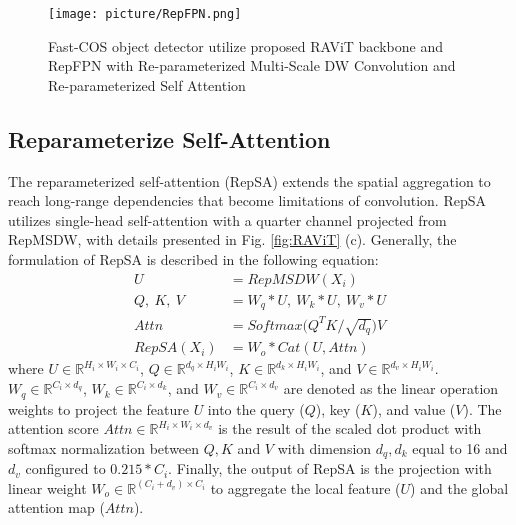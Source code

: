 \begin{figure*}
    \centering
    \texttt{[image: picture/RepFPN.png]}
    \caption{Fast-COS object detector utilize proposed RAViT backbone and RepFPN with Re-parameterized Multi-Scale DW Convolution and Re-parameterized Self Attention}
    \label{fig:RepFPN}
\end{figure*} 

\subsection{Reparameterize Self-Attention}
The reparameterized self-attention (RepSA) extends the spatial aggregation to reach long-range dependencies that become limitations of convolution. RepSA utilizes single-head self-attention with a quarter channel projected from RepMSDW, with details presented in Fig. \ref{fig:RAViT} (c). Generally, the formulation of RepSA is described in the following equation:
\begin{align}
    U &= RepMSDW(X_i) \\
    Q,\ K,\ V &=W_q*U,\ W_k*U,\ W_v*U\\
    Attn &= Softmax\Big(Q^TK/\sqrt{d_{q}}\Big)V \\
    RepSA(X_i) &=W_o*Cat(U,Attn)
\end{align}
where $U\in\mathbb{R}^{H_i\times W_i\times C_i}$, $Q\in\mathbb{R}^{d_q\times H_iW_i}$, $K\in\mathbb{R}^{d_k\times H_iW_i}$, and $V\in\mathbb{R}^{d_v\times H_iW_i}$. $W_q\in\mathbb{R}^{C_i\times d_q}$, $W_k\in\mathbb{R}^{C_i\times d_k}$, and $W_v\in\mathbb{R}^{C_i\times d_v}$ are denoted as the linear operation weights to project the feature $U$ into the query ($Q$), key ($K$), and value ($V$). The attention score $Attn\in\mathbb{R}^{H_i\times W_i\times d_v}$ is the result of the scaled dot product with softmax normalization between $Q, K$ and $V$ with dimension $d_q, d_k$ equal to 16 and $d_v$ configured to $0.215 * C_i$. Finally, the output of RepSA is the projection with linear weight $W_o\in\mathbb{R}^{(C_i+d_v)\times C_i}$ to aggregate the local feature ($U$) and the global attention map ($Attn$).

